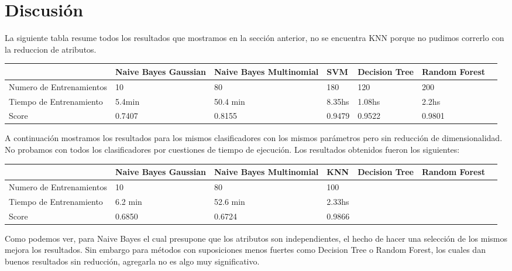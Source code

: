 \section{Discusión}

La siguiente tabla resume todos los resultados que mostramos en la sección anterior, no se encuentra KNN porque no pudimos correrlo con la reduccion de atributos.

\begin{center}
    \begin{tabular}{ | p{3cm} | p{2cm} | p{2.2cm} | p{1.5cm} | p{1.5cm} | p{2cm} | p{2cm} |}
    \hline
     & Naive Bayes Gaussian & Naive Bayes Multinomial & SVM & Decision Tree & Random Forest\\ \hline
    Numero de Entrenamientos & 10     &  80      & 180    & 120    &  200      \\ \hline
    Tiempo de Entrenamiento  & 5.4min & 50.4 min & 8.35hs & 1.08hs &  2.2hs    \\ \hline
    Score                    & 0.7407 & 0.8155   & 0.9479 & 0.9522 & 0.9801    \\ \hline
    \end{tabular}
\end{center} 

A continuación mostramos los resultados para los mismos clasificadores con los mismos parámetros pero sin reducción de dimensionalidad. No probamos con todos los clasificadores por cuestiones de tiempo de ejecución. Los resultados obtenidos fueron los siguientes:

\begin{center}
    \begin{tabular}{ | p{3cm} | p{2cm} | p{2.2cm} | p{1.5cm} | p{1.5cm} | p{2cm} | p{2cm} |}
    \hline
     & Naive Bayes Gaussian & Naive Bayes Multinomial & KNN & Decision Tree & Random Forest\\ \hline
    Numero de Entrenamientos & 10      & 80       &  100     &  &  \\ \hline
    Tiempo de Entrenamiento  & 6.2 min & 52.6 min &  2.33hs  &  &  \\ \hline
    Score                    & 0.6850  & 0.6724   &  0.9866  &  &  \\ \hline
    \end{tabular}
\end{center} 


Como podemos ver, para Naive Bayes el cual presupone que los atributos son independientes, el hecho de hacer una selección de los mismos mejora los resultados. Sin embargo para métodos con suposiciones menos fuertes como Decision Tree o Random Forest, los cuales dan buenos resultados sin reducción, agregarla no es algo muy significativo.\\

